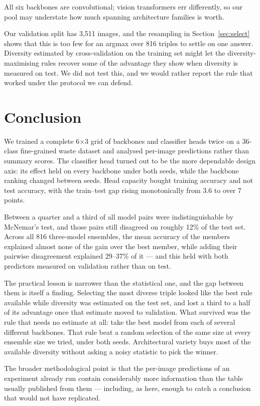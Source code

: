 \documentclass[runningheads]{llncs}
\begin{document}
All six backbones are convolutional; vision transformers err differently, so
our pool may understate how much spanning architecture families is worth.

Our validation split has 3{,}511 images, and the resampling in
Section~\ref{sec:select} shows that this is too few for an argmax over 816
triples to settle on one answer. Diversity estimated by cross-validation on the
training set might let the diversity-maximising rules recover some of the
advantage they show when diversity is measured on test. We did not test this,
and we would rather report the rule that worked under the protocol we can
defend.

\section{Conclusion}

We trained a complete 6$\times$3 grid of backbones and classifier heads twice on
a 36-class fine-grained waste dataset and analysed per-image predictions rather
than summary scores. The classifier head turned out to be the more dependable
design axis: its effect held on every backbone under both seeds, while the
backbone ranking changed between seeds. Head capacity bought training accuracy
and not test accuracy, with the train--test gap rising monotonically from 3.6 to
over 7 points.

Between a quarter and a third of all model pairs were indistinguishable by
McNemar's test, and those pairs still disagreed on roughly 12\% of the test set.
Across all 816 three-model ensembles, the mean accuracy of the members
explained almost none of the gain over the best member, while adding their
pairwise disagreement explained 29--37\% of it --- and this held with both predictors
measured on validation rather than on test.

The practical lesson is narrower than the statistical one, and the gap between
them is itself a finding. Selecting the most diverse triple looked like the
best rule available while diversity was estimated on the test set, and lost a
third to a half of its advantage once that estimate moved to validation. What survived
was the rule that needs no estimate at all: take the best model from each of
several different backbones. That rule beat a random selection of the same size
at every ensemble size we tried, under both seeds. Architectural variety buys
most of the available diversity without asking a noisy statistic to pick the
winner.

The broader methodological point is that the per-image predictions of an
experiment already run contain considerably more information than the table
usually published from them --- including, as here, enough to catch a
conclusion that would not have replicated.
\end{document}
